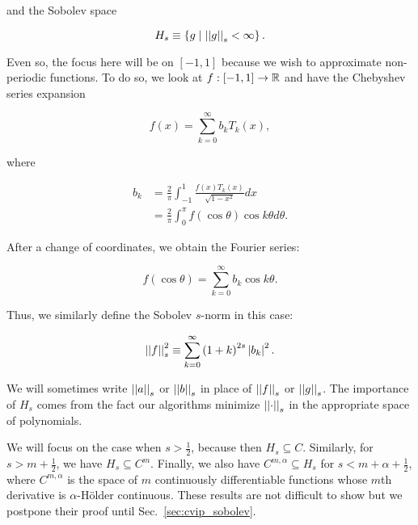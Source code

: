\noindent
and the Sobolev space

\begin{equation}
    H_{s} \equiv \left\{ g\mid \left| \left| g \right| \right|_{s}<\infty \right\}.
\end{equation}

Even so, the focus here will be on $[-1,1]$ because we wish to approximate
non-periodic functions.
To do so, we look at $f:\left[ -1,1 \right]\to\mathbb{R}$ and
have the Chebyshev series expansion

\begin{equation}
    f(x) = \sum_{k=0}^{\infty} b_{k}T_{k}(x),
\end{equation}

\noindent
where

\begin{samepage}
\begin{align}
    b_{k} &= \frac{2}{\pi} \int_{-1}^{1}\frac{f(x)T_{k}(x)}{\sqrt{1-x^{2}}}dx
        \nonumber\\
    &= \frac{2}{\pi} \int_{0}^{\pi} f(\cos\theta)\cos k\theta d\theta.
\end{align}
\end{samepage}

\noindent
After a change of coordinates, we obtain the Fourier series:

\begin{equation}
    f(\cos\theta) = \sum_{k=0}^{\infty} b_{k}\cos k\theta.
\end{equation}

\noindent
Thus, we similarly define the Sobolev $s$-norm in this case:

\begin{equation}
    \left| \left| f \right| \right|_{s}^{2} \equiv
        \sum_{k=0}^{\infty} \left( 1+k \right)^{2s}\left| b_{k} \right|^{2}.
\end{equation}

\noindent
We will sometimes write $\left| \left| a \right| \right|_{s}$ or $\left| \left| b \right| \right|_{s}$
in place of $\left| \left| f \right| \right|_{s}$ or $\left| \left| g \right| \right|_{s}$.
The importance of $H_{s}$ comes from the fact our algorithms minimize
$\left| \left| \cdot \right| \right|_{s}$ in the appropriate space of polynomials.

We will focus on the case when $s>\frac{1}{2}$, because then
$H_{s} \subseteq C$.
Similarly, for $s>m+\frac{1}{2}$, we have $H_{s} \subseteq C^{m}$.
Finally, we also have $C^{m,\alpha}\subseteq H_{s}$ for
$s<m+\alpha+\frac{1}{2}$, where $C^{m,\alpha}$ is the space of $m$
continuously differentiable functions whose $m$th derivative is
$\alpha$-H\"{o}lder continuous.
These results are not difficult to show but we postpone their proof until
Sec.~\ref{sec:cvip_sobolev}.



